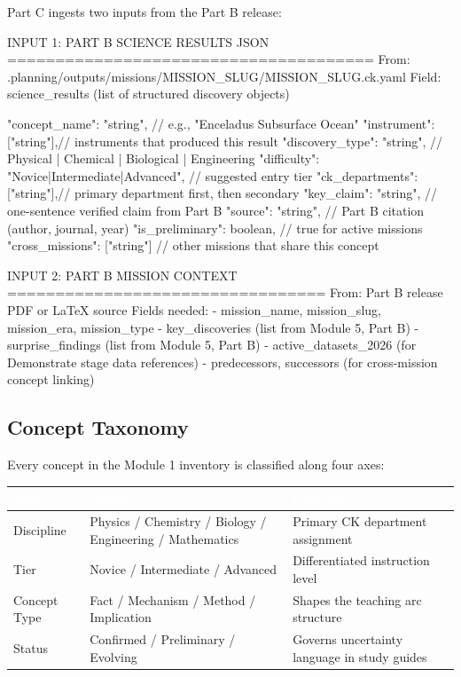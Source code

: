 \documentclass[11pt,letterpaper]{article}
\newcommand{\tableheader}[1]{\textbf{\sffamily\textcolor{white}{#1}}}
\begin{document}
Part C ingests two inputs from the Part B release:

\begin{asciibox}
INPUT 1: PART B SCIENCE RESULTS JSON
======================================
From: .planning/outputs/missions/{MISSION_SLUG}/{MISSION_SLUG}.ck.yaml
Field: science_results (list of structured discovery objects)

{
  "concept_name":     "string",  // e.g., "Enceladus Subsurface Ocean"
  "instrument":       ["string"],// instruments that produced this result
  "discovery_type":   "string",  // Physical | Chemical | Biological | Engineering
  "difficulty":       "Novice|Intermediate|Advanced",  // suggested entry tier
  "ck_departments":   ["string"],// primary department first, then secondary
  "key_claim":        "string",  // one-sentence verified claim from Part B
  "source":           "string",  // Part B citation (author, journal, year)
  "is_preliminary":   boolean,   // true for active missions
  "cross_missions":   ["string"] // other missions that share this concept
}

INPUT 2: PART B MISSION CONTEXT
=================================
From: Part B release PDF or LaTeX source
Fields needed:
  - mission_name, mission_slug, mission_era, mission_type
  - key_discoveries (list from Module 5, Part B)
  - surprise_findings (list from Module 5, Part B)
  - active_datasets_2026 (for Demonstrate stage data references)
  - predecessors, successors (for cross-mission concept linking)
\end{asciibox}

\subsection{Concept Taxonomy}

Every concept in the Module 1 inventory is classified along four axes:

\begin{center}
\begin{tabularx}{\textwidth}{L{2.5cm}L{2.5cm}X}
\toprule
{}
\tableheader{Axis} & \tableheader{Values} & \tableheader{Purpose} \\
\midrule
Discipline & Physics / Chemistry / Biology / Engineering / Mathematics & Primary CK department assignment \\
Tier & Novice / Intermediate / Advanced & Differentiated instruction level \\
Concept Type & Fact / Mechanism / Method / Implication & Shapes the teaching arc structure \\
Status & Confirmed / Preliminary / Evolving & Governs uncertainty language in study guides \\
\bottomrule
\end{tabularx}
\end{center}
\end{document}
